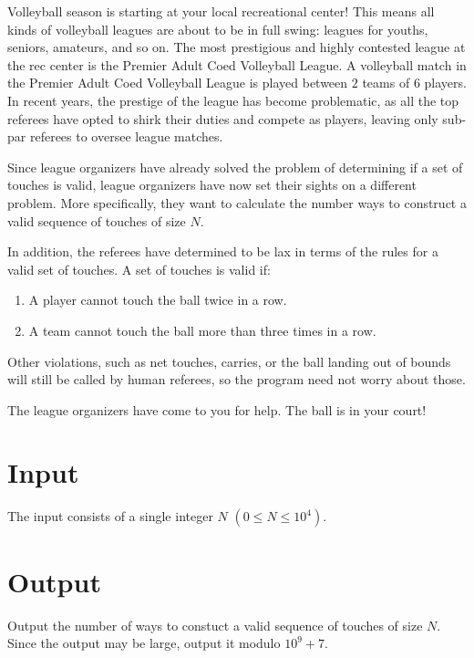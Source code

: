 
Volleyball season is starting at your local recreational center! This means all kinds of volleyball
leagues are about to be in full swing: leagues for youths, seniors, amateurs, and so on. The most
prestigious and highly contested league at the rec center is the Premier Adult Coed Volleyball
League. A volleyball match in the Premier Adult Coed Volleyball League is played between $2$ teams of
$6$ players. In recent years, the prestige of the league has become problematic, as all the top referees
have opted to shirk their duties and compete as players, leaving only sub-par referees to oversee
league matches.

Since league organizers have already solved the problem of determining if a set of touches is valid,
league organizers have now set their sights on a different problem. More specifically, they want to
calculate the number ways to construct a valid sequence of touches of size $N$.

In addition, the referees have determined to be lax in terms of the rules for a valid set of touches.
A set of touches is valid if:

\begin{enumerate}
    \item A player cannot touch the ball twice in a row.
    \item A team cannot touch the ball more than three times in a row.
\end{enumerate}

Other violations, such as net touches, carries, or the ball landing out of bounds will still be called
by human referees, so the program need not worry about those.

The league organizers have come to you for help. The ball is in your court!

\section*{Input}

The input consists of a single integer $N$ $(0 \leq N \leq 10^4)$.

\section*{Output}

Output the number of ways to constuct a valid sequence of touches of size $N$. Since the output may be
large, output it modulo $10^9 + 7$.
